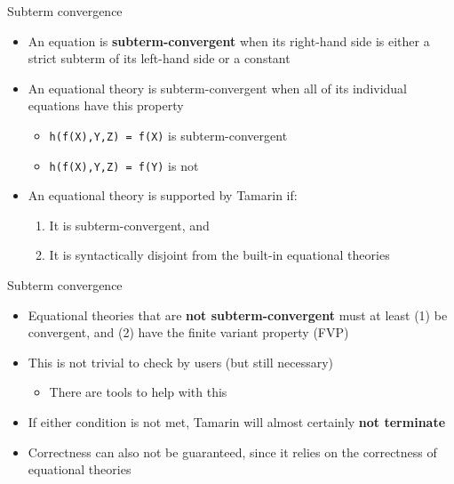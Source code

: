 \documentclass[11pt,aspectratio=169]{beamer}
\begin{document}
\begin{frame}[fragile]{Subterm convergence}
    \begin{itemize}
        \item An equation is \textbf{subterm-convergent} when its right-hand 
              side is either a strict subterm of its left-hand side or a 
              constant
        \item An equational theory is subterm-convergent when all of its 
              individual equations have this property
        \begin{itemize}
            \item[] \verb|h(f(X),Y,Z) = f(X)| is subterm-convergent
            \item[] \verb|h(f(X),Y,Z) = f(Y)| is not
        \end{itemize}
        \item An equational theory is supported by Tamarin if:
        \begin{enumerate}
            \item It is subterm-convergent, and
            \item It is syntactically disjoint from the built-in equational 
                  theories
        \end{enumerate}
    \end{itemize}
\end{frame}

\begin{frame}[fragile]{Subterm convergence}
    \begin{itemize}
        \item Equational theories that are \textbf{not subterm-convergent} must 
              at least (1) be convergent, and (2) have the finite variant 
              property (FVP)
        \item This is not trivial to check by users (but still necessary)
        \begin{itemize}
            \item There are tools to help with this
        \end{itemize}
        \item If either condition is not met, Tamarin will almost certainly 
              \textbf{not terminate}
        \item Correctness can also not be guaranteed, since it relies on the 
              correctness of equational theories
    \end{itemize}
\end{frame}
\end{document}

